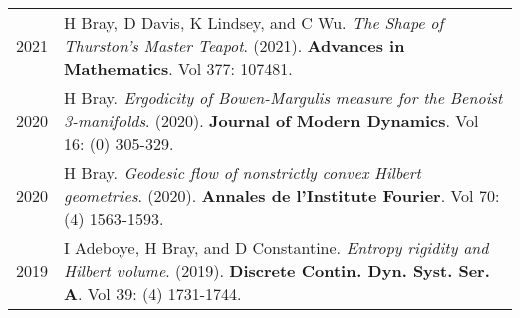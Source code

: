 \begin{center}
{\begin{longtable}{p{}  p{}}
2021 & 
        H Bray, D Davis, K Lindsey, and C Wu. \textit{The Shape of Thurston's Master Teapot}. (2021). 
        \textbf{Advances in Mathematics}. Vol 377: 107481.\\ 

2020 & 
        H Bray. \textit{Ergodicity of Bowen-Margulis measure for the Benoist 3-manifolds}. (2020). 
        \textbf{Journal of Modern Dynamics}. Vol 16: (0) 305-329.\\ 

2020 & 
        H Bray. \textit{Geodesic flow of nonstrictly convex Hilbert geometries}. (2020). 
        \textbf{Annales de l'Institute Fourier}. Vol 70: (4) 1563-1593.\\ 

2019 & 
        I Adeboye, H Bray, and D Constantine. \textit{Entropy rigidity and Hilbert volume}. (2019). 
        \textbf{Discrete Contin. Dyn. Syst. Ser. A}. Vol 39: (4) 1731-1744.
    \end{longtable}
    } 
    \end{center}

    \vspace{-1em}
    